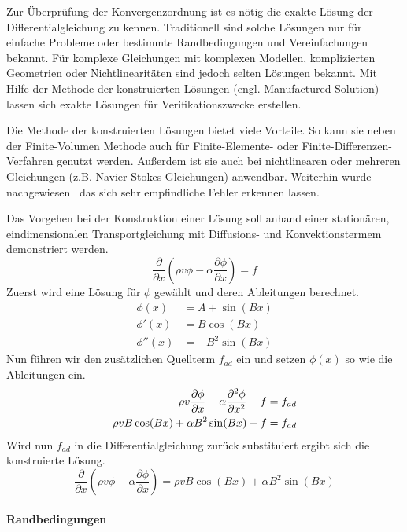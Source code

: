 Zur Überprüfung der Konvergenzordnung ist es nötig die exakte Lösung der Differentialgleichung zu
kennen. Traditionell sind solche Lösungen nur für einfache Probleme oder bestimmte Randbedingungen
und Vereinfachungen bekannt. Für komplexe Gleichungen mit komplexen Modellen, komplizierten Geometrien
oder Nichtlinearitäten sind jedoch selten Lösungen bekannt. Mit Hilfe der Methode der konstruierten
Lösungen (engl. Manufactured Solution) lassen sich exakte Lösungen für Verifikationszwecke erstellen.

Die Methode der konstruierten Lösungen bietet viele Vorteile. So kann sie neben der Finite-Volumen Methode auch
für Finite-Elemente- oder Finite-Differenzen-Verfahren genutzt werden. Außerdem ist sie auch bei nichtlinearen
oder mehreren Gleichungen (z.B. Navier-Stokes-Gleichungen) anwendbar. Weiterhin wurde nachgewiesen~\cite{roache_book} das sich
sehr empfindliche Fehler erkennen lassen.

Das Vorgehen bei der Konstruktion einer Lösung soll anhand einer stationären, eindimensionalen Transportgleichung
mit Diffusions- und Konvektionstermem demonstriert werden.
\begin{equation*}
  \frac{\partial}{\partial x} \left({\rho v \phi
- \alpha \frac{\partial \phi}{\partial x} }\right) = f
\end{equation*}
Zuerst wird eine Lösung für $\phi$ gewählt und deren Ableitungen berechnet.
\begin{align*}
  \phi(x) &= A + \sin(Bx)\\
  \phi'(x) &= B \cos(Bx)\\
  \phi''(x) &= -B^2\sin(Bx)
\end{align*}
Nun führen wir den zusätzlichen Quellterm $f_{ad}$ ein und setzen $\phi(x)$ so wie die Ableitungen ein.
\begin{align*}
  \rho v \pder[\phi]{x} - \alpha\frac{\partial^2 \phi}{\partial x^2}-f&=f_{ad}\\
  \rho v B \cos(Bx) + \alpha B^2 \sin(Bx) - f &= f_{ad}
\end{align*}
Wird nun $f_{ad}$ in die Differentialgleichung zurück substituiert ergibt sich die konstruierte Lösung.
\begin{equation}
   \frac{\partial}{\partial x} \left({\rho v \phi
- \alpha \frac{\partial \phi}{\partial x} }\right)= \rho v B \cos(Bx) + \alpha B^2 \sin(Bx)
\end{equation}

\paragraph{Randbedingungen}

